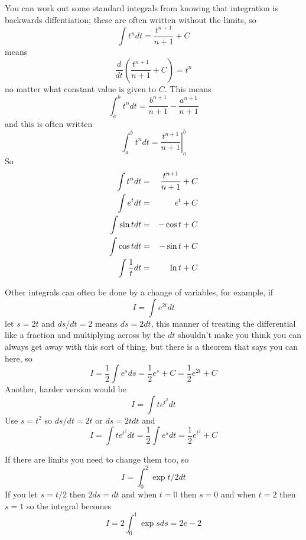 \documentclass[12pt]{article}
\begin{document}
You can work out some standard integrals from knowing that integration
is backwards diffentiation; these are often written without the limits,
so
\begin{equation}
\int t^ndt=\frac{t^{n+1}}{n+1}+C
\end{equation}
means
\begin{equation}
\frac{d}{dt}\left(\frac{t^{n+1}}{n+1}+C\right)=t^n
\end{equation}
no matter what constant value is given to $C$. This means
\begin{equation}
\int_a^b t^ndt=\frac{b^{n+1}}{n+1}-\frac{a^{n+1}}{n+1}
\end{equation}
and this is often written 
\begin{equation}
\int_a^b t^ndt=\left.\frac{t^{n+1}}{n+1}\right|_a^b
\end{equation}
So
\begin{eqnarray}
\int t^ndt&=&\frac{t^{n+1}}{n+1}+C\cr
\int e^tdt&=&e^t+C\cr
\int \sin{t}dt&=&-\cos{t}+C\cr
\int \cos{t}dt&=&-\sin{t}+C\cr
\int \frac{1}{t}dt&=&\ln{t}+C
\end{eqnarray}

Other integrals can often be done by a change of variables, for example, if 
\begin{equation}
I=\int e^{2t}dt
\end{equation}
let $s=2t$ and $ds/dt=2$ means $ds=2dt$, this manner of treating the
differential like a fraction and multiplying across by the $dt$
shouldn't make you think you can always get away with this sort of
thing, but there is a theorem that says you can here, so
\begin{equation}
I=\frac{1}{2}\int e^sds=\frac{1}{2}e^s+C=\frac{1}{2}e^{2t}+C
\end{equation}
Another, harder version would be
\begin{equation}
I=\int te^{t^2}dt
\end{equation}
Use $s=t^2$ so $ds/dt=2t$ or $ds=2tdt$ and
\begin{equation}
I=\int te^{t^2}dt=\frac{1}{2}\int e^{s}dt=\frac{1}{2}e^{t^2}+C
\end{equation}

If there are limits you need to change them too, so
\begin{equation}
I=\int_0^2 \exp{t/2}dt
\end{equation}
If you let $s=t/2$ then $2ds=dt$ and when $t=0$ then $s=0$ and when $t=2$ then $s=1$ so the integral becomes
\begin{equation}
I=2\int_0^1 \exp{s}ds=2e-2
\end{equation}
\end{document}
